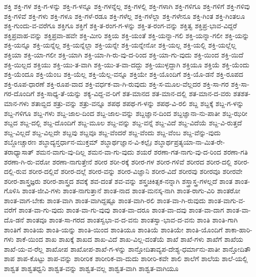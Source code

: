 {ಶಕ್ತಿ
ಶಕ್ತಿ-ಗಳ
ಶಕ್ತಿ-ಗ-ಳನ್ನು
ಶಕ್ತಿ-ಗ-ಳನ್ನೂ
ಶಕ್ತಿ-ಗಳನ್ನೆಲ್ಲ
ಶಕ್ತಿ-ಗಳಲ್ಲಿ
ಶಕ್ತಿ-ಗಳಾಗಿ
ಶಕ್ತಿ-ಗಳಿಗೂ
ಶಕ್ತಿ-ಗಳಿಗೆ
ಶಕ್ತಿ-ಗಳಿವು
ಶಕ್ತಿ-ಗಳಿವೆ
ಶಕ್ತಿ-ಗಳು
ಶಕ್ತಿ-ಗಳೂ
ಶಕ್ತಿ-ಗಳೆ-ರಡೂ
ಶಕ್ತಿ-ಗಳೆಲ್ಲ
ಶಕ್ತಿ-ಗಳೆಲ್ಲಾ
ಶಕ್ತಿ-ಗಳೇನೂ
ಶಕ್ತಿ-ಗಿಂತ
ಶಕ್ತಿ-ಗಿಂತಲೂ
ಶಕ್ತಿ-ಗುಂದು-ವ-ವರೆಗೂ
ಶಕ್ತಿಗೂ
ಶಕ್ತಿಗೆ
ಶಕ್ತಿ-ತ-ರಂಗ-ಗ-ಳನ್ನು
ಶಕ್ತಿ-ತ-ರಂಗ-ವನ್ನು
ಶಕ್ತಿತ್ವ
ಶಕ್ತಿಪ್ರ-ಭಾವ-ವಿದ್ದರೆ
ಶಕ್ತಿಪ್ರವಾಹ-ವನ್ನು
ಶಕ್ತಿಪ್ರವಾ-ಹವೇ
ಶಕ್ತಿ-ಮೀರಿ
ಶಕ್ತಿಯ
ಶಕ್ತಿ-ಯಂತೆ
ಶಕ್ತಿ-ಯನ್ನಾ-ಗಲಿ
ಶಕ್ತಿ-ಯನ್ನಾ-ಗಲೀ
ಶಕ್ತಿ-ಯನ್ನು
ಶಕ್ತಿ-ಯನ್ನೂ
ಶಕ್ತಿ-ಯನ್ನೆಲ್ಲ
ಶಕ್ತಿ-ಯನ್ನೆಲ್ಲಾ
ಶಕ್ತಿ-ಯನ್ನೇ
ಶಕ್ತಿ-ಯನ್ನೇನೋ
ಶಕ್ತಿ-ಯಲ್ಲ
ಶಕ್ತಿ-ಯಲ್ಲಿ
ಶಕ್ತಿ-ಯಲ್ಲೆಲ್ಲ
ಶಕ್ತಿಯಾ
ಶಕ್ತಿ-ಯಾ-ಗಲೀ
ಶಕ್ತಿ-ಯಾಗಿ
ಶಕ್ತಿ-ಯಾ-ಗಿ-ರು-ವು-ದ-ರಿಂದ
ಶಕ್ತಿ-ಯಾ-ಗು-ವುದು
ಶಕ್ತಿ-ಯಿಂದ
ಶಕ್ತಿ-ಯಿದೆ
ಶಕ್ತಿ-ಯಿಲ್ಲದ
ಶಕ್ತಿಯು
ಶಕ್ತಿ-ಯು-ತ-ವಾಗಿ
ಶಕ್ತಿ-ಯು-ತ-ವಾ-ದದ್ದು
ಶಕ್ತಿ-ಯುಳ್ಳದ್ದಾಗಿ
ಶಕ್ತಿಯೂ
ಶಕ್ತಿಯೆ
ಶಕ್ತಿ-ಯೆಂದು
ಶಕ್ತಿ-ಯೆಂದೂ
ಶಕ್ತಿ-ಯೆಂಬ
ಶಕ್ತಿ-ಯೆಲ್ಲ
ಶಕ್ತಿ-ಯೆಲ್ಲ-ವನ್ನೂ
ಶಕ್ತಿಯೇ
ಶಕ್ತಿ-ಯೊಂದಿಗೆ
ಶಕ್ತಿ-ಯೊ-ಡನೆ
ಶಕ್ತಿ-ರೂಪದ
ಶಕ್ತಿ-ರೂಪ-ಧಾರಣೆ
ಶಕ್ತಿ-ರೂಪ-ವಾದ
ಶಕ್ತಿ-ವರ್ಧಕ-ವಾ-ಗಿ-ರುವುದು
ಶಕ್ತಿ-ಸ-ಮೂಲ-ವೆಲ್ಲದರ
ಶಕ್ತಿ-ಸಾ-ಗರ
ಶಕ್ತಿ-ಸಾ-ಗರ-ದೊಂದಿಗೆ
ಶಕ್ತಿ-ಸಾಧ್ಯ-ತೆ-ಯನ್ನು
ಶಕ್ಯ-ವಿದ್ದ-ವ-ರಿಗೆ
ಶತ-ಮಾನದ
ಶತ-ಮಾನ-ದಲ್ಲಿ
ಶತ-ಮಾನ-ದ-ವರು
ಶತಶತ-ಮಾನ-ಗಳು
ಶತಾಬ್ದಿದ
ಶತ್ರು-ವನ್ನು
ಶತ್ರು-ವನ್ನೂ
ಶಪಥ
ಶಪಥ-ಗ-ಳನ್ನು
ಶಪಥ-ವಿ-ರಲಿ
ಶಬ್ದ
ಶಬ್ದಕ್ಕೆ
ಶಬ್ದ-ಗ-ಳನ್ನು
ಶಬ್ದ-ಗಳಿಗೂ
ಶಬ್ದ-ಗಳು
ಶಬ್ದ-ಜಾಲ-ದಿಂದ
ಶಬ್ದ-ಜಾಲ-ವನ್ನು
ಶಬ್ದಜ್ಞಾನ-ದಿಂದ
ಶಬ್ದಜ್ಞಾನಾ-ನು-ಪಾತೀ
ಶಬ್ದ-ಝರೀ
ಶಬ್ದದ
ಶಬ್ದ-ದಲ್ಲಿ
ಶಬ್ದ-ದೊಂದಿಗೆ
ಶಬ್ದ-ಮೂಲ
ಶಬ್ದ-ವನ್ನು
ಶಬ್ದ-ವನ್ನೆ
ಶಬ್ದ-ವಿದೆ
ಶಬ್ದ-ವಿದೆಯೆ
ಶಬ್ದ-ವಿ-ರುತ್ತದೆ
ಶಬ್ದ-ವಿಲ್ಲದೆ
ಶಬ್ದ-ವಿಲ್ಲದೇ
ಶಬ್ದವು
ಶಬ್ದವೂ
ಶಬ್ದ-ವೆಂದರೆ
ಶಬ್ದ-ವೆಂದು
ಶಬ್ದ-ವೆಂಬ
ಶಬ್ದ-ವೆನ್ನು-ವುದು
ಶಬ್ದೋಚ್ಚಾರಣ
ಶಬ್ಧಾದ್ಯನ್ತರ್ಧಾನ-ಮುಕ್ತಮ್
ಶಬ್ಧಾರ್ಥಜ್ಞಾನ-ವಿ-ಕಲ್ಪೈಃ
ಶಬ್ಧಾರ್ಥಪ್ರತ್ಯಯಾ-ನಾ-ಮಿತ-ರೇ-ತರಾಧ್ಯಾಸಾತ್
ಶಮನ-ವಾಗು-ವು-ದಿಲ್ಲ
ಶಮನ-ವಾ-ಗು-ವುದು
ಶಯರೆ
ಶರಣಾ-ಗತ-ನಾಗು-ವು-ದ-ರಿಂದ
ಶರಣಾ-ಗತಿ
ಶರಣಾ-ಗಿ-ರು-ವರೋ
ಶರಣಾ-ನಾಗುತ್ತೇನೆ
ಶರೀರ
ಶರೀ-ರಕ್ಕೆ
ಶರೀರ-ಗಳ
ಶರೀರ-ಗಳಿವೆ
ಶರೀರದ
ಶರೀರ-ದಲ್ಲಿ
ಶರೀರ-ದಲ್ಲಿ-ರುವ
ಶರೀರ-ದಲ್ಲಿವೆ
ಶರೀರ-ದಲ್ಲೆ
ಶರೀರ-ವನ್ನು
ಶರೀರ-ವಿಜ್ಞಾನಿ
ಶರೀರ-ವಿದೆ
ಶರೀರವು
ಶರೀರವೂ
ಶರೀರವೇ
ಶರೀರ-ಶಾಸ್ತ್ರಜ್ಞರು
ಶರೀರ-ಶಾಸ್ತ್ರದ
ಶವಕ್ಕೆ
ಶವ-ದಂತೆ
ಶವ-ವನ್ನು
ಶಸ್ತ್ರಚಿಕಿತ್ಸಕ-ನನ್ನಾಗಿ
ಶಸ್ತ್ರಾಸ್ತ್ರ-ಗಳಲ್ಲದೆ
ಶಾಂತ
ಶಾಂತ-ಗೊಳಿಸಿ
ಶಾಂತ-ಜೀವಿ-ಗಳು
ಶಾಂತ-ನಾಗುತ್ತಾನೆ
ಶಾಂತ-ನಾದ
ಶಾಂತ-ಮನಸ್ಕ-ನಾಗಿ
ಶಾಂತ-ರಾಗು-ವಿರಿ
ಶಾಂತರೋ
ಶಾಂತ-ವಾಗ-ಬೇಕು
ಶಾಂತ-ವಾಗಿ
ಶಾಂತ-ವಾಗಿದ್ದಷ್ಟೂ
ಶಾಂತ-ವಾಗಿ-ರಲಿ
ಶಾಂತ-ವಾ-ಗಿ-ರುವುದು
ಶಾಂತ-ವಾಗು-ವ-ವರೆಗೆ
ಶಾಂತ-ವಾ-ಗು-ವುದು
ಶಾಂತ-ವಾ-ಗು-ವುವು
ಶಾಂತ-ವಾ-ದರೂ
ಶಾಂತ-ವಾ-ದವು
ಶಾಂತ-ವಾ-ದಾಗ
ಶಾಂತ-ವಾ-ದೊ-ಡನೆ
ಶಾಂತವೂ
ಶಾಂತ-ಸಾ-ಗರದ
ಶಾಂತಸ್ವಭಾ-ವ-ದ-ವನು
ಶಾಂತಸ್ವಾ-ಭಾವ-ದ-ವನು
ಶಾಂತಿ
ಶಾಂತಿ-ಗಾಗಿ
ಶಾಂತಿಗೆ
ಶಾಂತಿಯ
ಶಾಂತಿ-ಯನ್ನು
ಶಾಂತಿ-ಯಿಂದ
ಶಾಂತಿಯೂ
ಶಾಂತಿಯೆ
ಶಾಂತಿಯೇ
ಶಾಂತಿ-ಯೊಂದಿಗೆ
ಶಾಕಾ-ಹಾರಿ-ಗಳು
ಶಾಕೆ-ಯಿಂದ
ಶಾಖ
ಶಾಖಕ್ಕೆ
ಶಾಖದ
ಶಾಖ-ವಿದೆ
ಶಾಖ-ವಿಲ್ಲ-ದಂತೆಯೆ
ಶಾಖೆ
ಶಾಖೆ-ಗಳು
ಶಾಖೆಗೆ
ಶಾಖೆಯ
ಶಾಖೆ-ಯ-ವ-ರೆಲ್ಲ
ಶಾಖೋಪ
ಶಾಖೋಪ-ಶಾಖೆ-ಗ-ಳನ್ನು
ಶಾನ್ತೋದಿತಾವ್ಯಪ-ದೇಶ್ಯ-ಧರ್ಮಾನು-ಪಾತೀ
ಶಾನ್ತೋದಿತೌ
ಶಾಪ
ಶಾಪ-ಕೊಟ್ಟು
ಶಾಪ-ವನ್ನು
ಶಾರೀರಿಕ
ಶಾರೀರಿಕ-ವಾ-ದುದು
ಶಾರೀರಿ-ಕವೇ
ಶಾಲಿ
ಶಾಲೆಗೆ
ಶಾಲೆಯ
ಶಾಲೆ-ಯಲ್ಲಿ
ಶಾಶ್ವತ
ಶಾಶ್ವತಧ್ವನಿ
ಶಾಶ್ವತ-ವನ್ನು
ಶಾಶ್ವತ-ವಲ್ಲ
ಶಾಶ್ವತ-ವಾಗಿ
ಶಾಶ್ವತ-ವಾಗಿಯೂ
}
